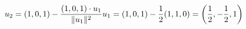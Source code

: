\documentclass[preview]{standalone}
\begin{document}
\begin{align*}
\special{dvisvgm:raw <g id='unique000'>}u_2=(1,0,1)-\dfrac{(1,0,1)\cdot u_1}{\|u_1\|^2}u_1=(1,0,1)-\dfrac{1}{2}(1,1,0)=\left(\dfrac{1}{2},-\dfrac{1}{2},1\right)\special{dvisvgm:raw </g>}
\end{align*}
\end{document}
